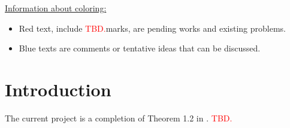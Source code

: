 \documentclass[twoside,12pt,a4paper]{article}
\numberwithin{equation}{section}
\newcommand\TBD{\textcolor{red}{TBD.}}
\begin{document}
	\maketitle

	\setcounter{page}{1} 
	
	\begin{abstract}
		This document is an outline of the article for the Scaling limit of SIRW. We complete the functional CLT in \cite{KMP22} for the asymptotically free self-interacting random walk (AF-SIRW) in the case $0<p \leq \frac{1}{2}$. The approach is to carefully approximate the local drifts of the random walk via the study of the directed edge local times, which are described by branching-like processes and generalized Ray-knight Theorems. Xiaoyu Liu and Zhe Wang are working on this project. 
		\TBD
	\end{abstract}
	
	\underline{\textsf{Information about coloring:}}
	\begin{itemize}
		\item 
	\textsf{\color{red} Red text, include \TBD marks, are pending works and existing problems.}
		\item 
			\textsf{\color{blue} Blue texts are comments or tentative ideas that can be discussed.}
	\end{itemize}



	\section{Introduction}
	The current project is a completion of Theorem 1.2 in \cite{KMP22}. 
	\TBD 
	
\end{document}
